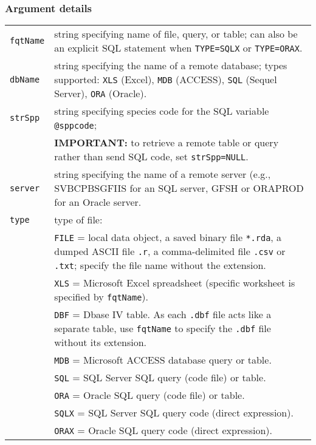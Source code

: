 \documentclass[letterpaper,12pt,fleqn]{article}
\newcommand{\code}[1]{\small\texttt{#1}\normalsize}
\newcommand{\db}[1]{\small\textmd{\textsf{#1}}\normalsize}
\newcommand{\bold}[1]{{\bf #1}}
\begin{document}
\subsubsection {Argument details}
\begin{longtable}[1]{l>{\raggedright\arraybackslash}p{} }
  \code{fqtName}    &  string specifying name of file, query, or table; can also be an explicit SQL statement when \code{TYPE=SQLX} or \code{TYPE=ORAX}.\\
  \code{dbName}     &  string specifying the name of a remote database; types supported: \code{XLS} (Excel), \code{MDB} (ACCESS), \code{SQL} (Sequel Server), \code{ORA} (Oracle).\\
  \code{strSpp}     &  string specifying species code for the SQL variable \code{@sppcode};\\
                    &  \bold{\db{IMPORTANT:}} to retrieve a remote table or query rather than send SQL code, set \code{strSpp=NULL}.\\
  \code{server}     &  string specifying the name of a remote server (e.g., \db{SVBCPBSGFIIS} for an SQL server, \db{GFSH} or \db{ORAPROD} for an Oracle server.\\
  \code{type}       &  type of file: \\
                    &  \code{FILE} = local data object, a saved binary file \code{*.rda}, a dumped ASCII file \code{.r}, a comma-delimited file \code{.csv} or \code{.txt}; specify the file name without the extension.\\
                    &  \code{XLS} = Microsoft Excel spreadsheet (specific worksheet is specified by \code{fqtName}).\\
                    &  \code{DBF} = Dbase IV table. As each \code{.dbf} file acts like a separate table, use \code{fqtName} to specify the \code{.dbf} file  without its extension.\\
                    &  \code{MDB} = Microsoft ACCESS database query or table.\\
                    &  \code{SQL} = SQL Server SQL query (code file) or table.\\
                    &  \code{ORA} = Oracle SQL query (code file) or table.\\
                    &  \code{SQLX} = SQL Server SQL query code (direct expression).\\
                    &  \code{ORAX} = Oracle SQL query code (direct expression).\\

\end{longtable}
\end{document}
